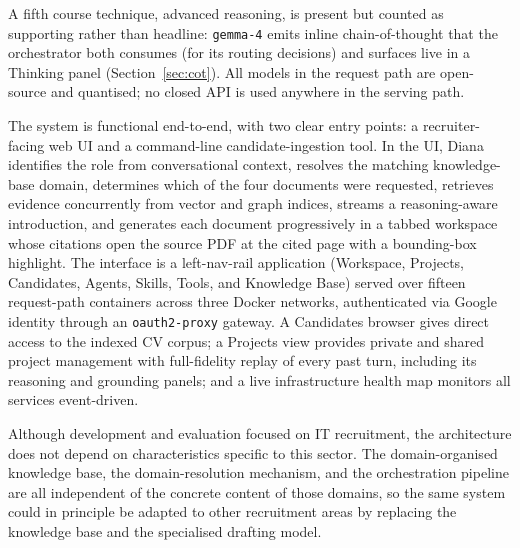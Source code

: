 A fifth course technique, advanced reasoning, is present but counted as supporting
rather than headline: \verb|gemma-4| emits inline chain-of-thought that the orchestrator
both consumes (for its routing decisions) and surfaces live in a Thinking panel
(Section~\ref{sec:cot}). All models in the request path are open-source and quantised; no
closed API is used anywhere in the serving path.

The system is functional end-to-end, with two clear entry points: a recruiter-facing web
UI and a command-line candidate-ingestion tool. In the UI, Diana identifies the role from
conversational context, resolves the matching knowledge-base domain, determines which of
the four documents were requested, retrieves evidence concurrently from vector and graph
indices, streams a reasoning-aware introduction, and generates each document
progressively in a tabbed workspace whose citations open the source PDF at the cited page
with a bounding-box highlight. The interface is a left-nav-rail application (Workspace,
Projects, Candidates, Agents, Skills, Tools, and Knowledge Base) served over fifteen
request-path containers across three Docker networks, authenticated via Google identity
through an \verb|oauth2-proxy| gateway. A Candidates browser gives direct access to the
indexed CV corpus; a Projects view provides private and shared project management with
full-fidelity replay of every past turn, including its reasoning and grounding panels;
and a live infrastructure health map monitors all services event-driven.

Although development and evaluation focused on IT recruitment, the architecture does not
depend on characteristics specific to this sector. The domain-organised knowledge base,
the domain-resolution mechanism, and the orchestration pipeline are all independent of
the concrete content of those domains, so the same system could in principle be adapted
to other recruitment areas by replacing the knowledge base and the specialised drafting
model.
